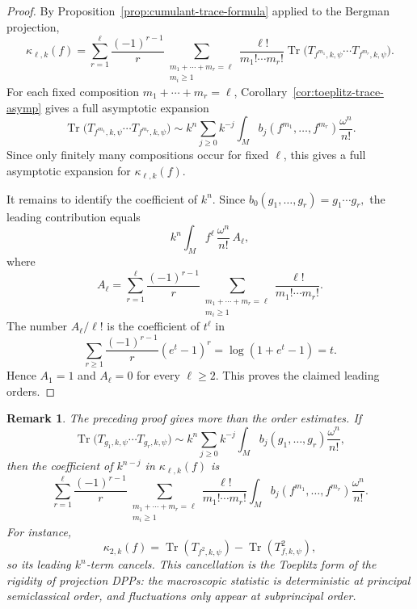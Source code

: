 \documentclass[12pt,a4paper,reqno]{article}
\theoremstyle{thmstyleone}
\theoremstyle{thmstylethree}
\theoremstyle{thmstyletwo}
\newtheorem{remark}[theorem]{Remark}
\numberwithin{equation}{subsection}
\def\geq{\geqslant}
\begin{document}
\begin{proof}
By Proposition~\ref{prop:cumulant-trace-formula} applied to the Bergman projection,
\[
    \kappa_{\ell,k}(f)
    =
    \sum_{r=1}^{\ell}
    \frac{(-1)^{r-1}}{r}
    \sum_{\substack{m_1+\cdots+m_r=\ell\\ m_i\geq 1}}
    \frac{\ell!}{m_1!\cdots m_r!}
    \operatorname{Tr}
    \bigl(
        T_{f^{m_1},k,\psi}\cdots T_{f^{m_r},k,\psi}
    \bigr).
\]
For each fixed composition $m_1+\cdots+m_r=\ell$, Corollary~\ref{cor:toeplitz-trace-asymp} gives a full asymptotic expansion
\[
    \operatorname{Tr}
    \bigl(
        T_{f^{m_1},k,\psi}\cdots T_{f^{m_r},k,\psi}
    \bigr)
    \sim
    k^n\sum_{j\geq 0}k^{-j}
    \int_M
    b_j(f^{m_1},\ldots,f^{m_r})\frac{\omega^n}{n!}.
\]
Since only finitely many compositions occur for fixed $\ell$, this gives a full asymptotic expansion for $\kappa_{\ell,k}(f)$.

It remains to identify the coefficient of $k^n$. Since $b_0(g_1,\ldots,g_r)=g_1\cdots g_r,$ the leading contribution equals
\[
    k^n\int_M f^\ell\,\frac{\omega^n}{n!}\,A_\ell,
\]
where
\[
    A_\ell
    =
    \sum_{r=1}^{\ell}
    \frac{(-1)^{r-1}}{r}
    \sum_{\substack{m_1+\cdots+m_r=\ell\\ m_i\geq 1}}
    \frac{\ell!}{m_1!\cdots m_r!}.
\]
The number $A_\ell/\ell!$ is the coefficient of $t^\ell$ in
\[
    \sum_{r\geq 1}
    \frac{(-1)^{r-1}}{r}(e^t-1)^r
    =
    \log(1+e^t-1)
    =
    t.
\]
Hence $A_1=1$ and $A_\ell=0$ for every $\ell\geq 2$. This proves the claimed leading orders.
\end{proof}

\begin{remark}
The preceding proof gives more than the order estimates. If
\[
    \operatorname{Tr}
    \bigl(T_{g_1,k,\psi}\cdots T_{g_r,k,\psi}\bigr)
    \sim
    k^n\sum_{j\geq 0}k^{-j}
    \int_M b_j(g_1,\ldots,g_r)\frac{\omega^n}{n!},
\]
then the coefficient of $k^{n-j}$ in $\kappa_{\ell,k}(f)$ is
\[
    \sum_{r=1}^{\ell}
    \frac{(-1)^{r-1}}{r}
    \sum_{\substack{m_1+\cdots+m_r=\ell\\ m_i\geq 1}}
    \frac{\ell!}{m_1!\cdots m_r!}
    \int_M
    b_j(f^{m_1},\ldots,f^{m_r})\frac{\omega^n}{n!}.
\]
For instance,
\[
    \kappa_{2,k}(f)
    =
    \operatorname{Tr}(T_{f^2,k,\psi})
    -
    \operatorname{Tr}(T_{f,k,\psi}^2),
\]
so its leading $k^n$-term cancels. This cancellation is the Toeplitz form of the rigidity of projection DPPs: the macroscopic statistic is deterministic at principal semiclassical order, and fluctuations only appear at subprincipal order.
\end{remark}
\end{document}
